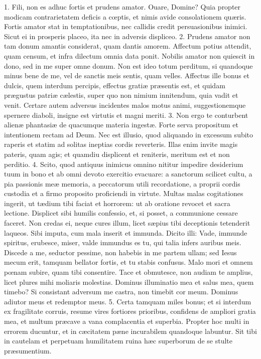 \documentclass[twoside]{article}
\begin{document}
1. Fili, non es adhuc fortis et prudens amator.
Ouare, Domine?
Quia propter modicam contrarietatem deficis a cœptis, et nimis avide consolationem quæris. Fortis amator stat in temptationibus, nec callidis credit persuasionibus inimici. Sicut ei in prosperis placeo, ita nec in adversis displiceo.
2. Prudens amator non tam donum amantis considerat, quam dantis amorem. Affectum potius attendit, quam censum, et infra dilectum omnia data ponit. Nobilis amator non quiescit in dono, sed in me super omne donum. Non est ideo totum perditum, si quandoque minus bene de me, vel de sanctis meis sentis, quam velles. Affectus ille bonus et dulcis, quem interdum percipis, effectus gratiæ præsentis est, et quidam prægustus patriæ cælestis, super quo non nimium innitendum, quia vadit et venit. Certare autem adversus incidentes malos motus animi, suggestionemque spernere diaboli, insigne est virtutis et magni meriti.
3. Non ergo te conturbent alienæ phantasiæ de quacumque materia ingestæ. Forte serva propositum et intentionem rectam ad Deum. Nec est illusio, quod aliquando in excessum subito raperis et statim ad solitas ineptias cordis reverteris. Illas enim invite magis pateris, quam agis; et quamdiu displicent et reniteris, meritum est et non perditio.
4. Scito, quod antiquus inimicus omnino nititur impedire desiderium tuum in bono et ab omni devoto exercitio evacuare: a sanctorum scilicet cultu, a pia passionis meæ memoria, a peccatorum utili recordatione, a proprii cordis custodia et a firmo proposito proficiendi in virtute. Multas malas cogitationes ingerit, ut tædium tibi faciat et horrorem: ut ab oratione revocet et sacra lectione. Displicet sibi humilis confessio, et, si posset, a communione cessare faceret. Non credas ei, neque cures illum, licet sæpius tibi deceptionis tetenderit laqueos. Sibi imputa, cum mala inserit et immunda. Dicito illi: Vade, immunde spiritus, erubesce, miser, valde immundus es tu, qui talia infers auribus meis. Discede a me, seductor pessime, non habebis in me partem ullam; sed Iesus mecum erit, tamquam bellator fortis, et tu stabis confusus. Malo mori et omnem pœnam subire, quam tibi consentire. Tace et obmutesce, non audiam te amplius, licet plures mihi moliaris molestias. Dominus illuminatio mea et salus mea, quem timebo? Si consistant adversum me castra, non timebit cor meum. Dominus adiutor meus et redemptor meus.
5. Certa tamquam miles bonus; et si interdum ex fragilitate corruis, resume vires fortiores prioribus, confidens de ampliori gratia mea, et multum præcave a vana complacentia et superbia. Propter hoc multi in errorem ducuntur, et in cæcitatem pæne incurabilem quandoque labuntur. Sit tibi in cautelam et perpetuam humilitatem ruina hæc superborum de se stulte præsumentium.
\end{document}

